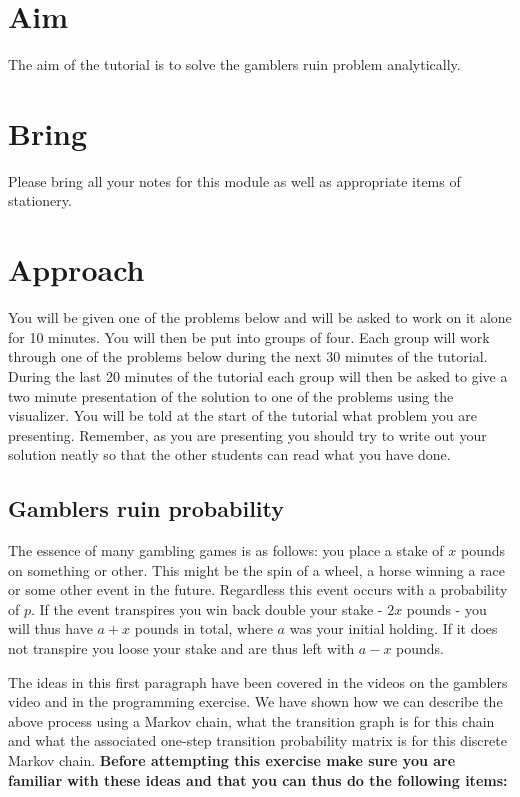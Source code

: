 \documentclass[a4paper]{article}
\begin{document}
\section{Aim}

The aim of the tutorial is to solve the gamblers ruin problem analytically.  

\section{Bring}

Please bring all your notes for this module as well as appropriate items of stationery.

\section{Approach}

You will be given one of the problems below and will be asked to work on it alone for 10 minutes.  You will then be put into groups of four.  Each group will work through one of the problems 
below during the next 30 minutes of the tutorial.  During the last 20 minutes of the tutorial each group will then be asked to give a two minute presentation of the solution to one of the problems 
using the visualizer.  You will be told at the start of the tutorial what problem you are presenting.  Remember, as you are presenting you should try to write out your solution neatly so that the 
other students can read what you have done.

\subsection{Gamblers ruin probability}

The essence of many gambling games is as follows: you place a stake of $x$ pounds on something or other.  This might be the spin of a wheel, a horse winning a race or some other event in the future.
Regardless this event occurs with a probability of $p$.  If the event transpires you win back double your stake - $2x$ pounds - you will thus have $a + x$ pounds in total, where $a$ was your initial
holding.  If it does not transpire you loose your stake and are thus left with $a - x$ pounds.

The ideas in this first paragraph have been covered in the videos on the gamblers video and in the programming exercise.  We have shown how we can describe the above process using a Markov chain,
what the transition graph is for this chain and what the associated one-step transition probability matrix is for this discrete Markov chain.  {\bf Before attempting this exercise make sure you are
familiar with these ideas and that you can thus do the following items:}
\end{document}
